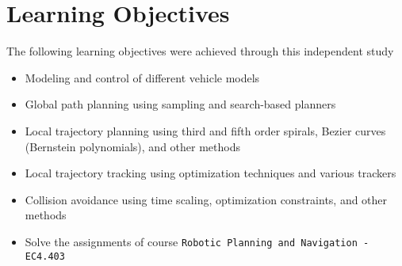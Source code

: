 
\section{Learning Objectives}

The following learning objectives were achieved through this independent study

\begin{itemize}
    \item Modeling and control of different vehicle models
    \item Global path planning using sampling and search-based planners
    \item Local trajectory planning using third and fifth order spirals, Bezier curves (Bernstein polynomials), and other methods
    \item Local trajectory tracking using optimization techniques and various trackers
    \item Collision avoidance using time scaling, optimization constraints, and other methods
    \item Solve the assignments of course \texttt{Robotic Planning and Navigation - EC4.403}
\end{itemize}
